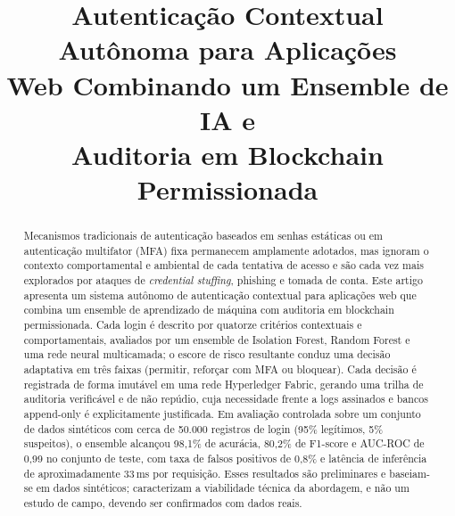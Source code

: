 \documentclass[conference]{IEEEtran}
\begin{document}
\title{Autenticação Contextual Autônoma para Aplicações\\ Web Combinando um Ensemble de IA e\\ Auditoria em Blockchain Permissionada}

\author{
\and
{}
}

\maketitle

\begin{abstract}
Mecanismos tradicionais de autenticação baseados em senhas estáticas ou
em autenticação multifator (MFA) fixa permanecem amplamente adotados,
mas ignoram o contexto comportamental e ambiental de cada tentativa de
acesso e são cada vez mais explorados por ataques de \emph{credential
stuffing}, phishing e tomada de conta. Este artigo apresenta um sistema
autônomo de autenticação contextual para aplicações web que combina um
ensemble de aprendizado de máquina com auditoria em blockchain
permissionada. Cada login é descrito por quatorze critérios contextuais
e comportamentais, avaliados por um ensemble de Isolation Forest, Random
Forest e uma rede neural multicamada; o escore de risco resultante
conduz uma decisão adaptativa em três faixas (permitir, reforçar com MFA
ou bloquear). Cada decisão é registrada de forma imutável em uma rede
Hyperledger Fabric, gerando uma trilha de auditoria verificável e de não
repúdio, cuja necessidade frente a logs assinados e bancos append-only é
explicitamente justificada. Em avaliação controlada sobre um conjunto de
dados sintéticos com cerca de 50.000 registros de login (95\% legítimos,
5\% suspeitos), o ensemble alcançou 98,1\% de acurácia, 80,2\% de
F1-score e AUC-ROC de 0,99 no conjunto de teste, com taxa de falsos
positivos de 0,8\% e latência de inferência de aproximadamente 33\,ms
por requisição. Esses resultados são preliminares e baseiam-se em dados
sintéticos; caracterizam a viabilidade técnica da abordagem, e não um
estudo de campo, devendo ser confirmados com dados reais.
\end{abstract}
\end{document}
